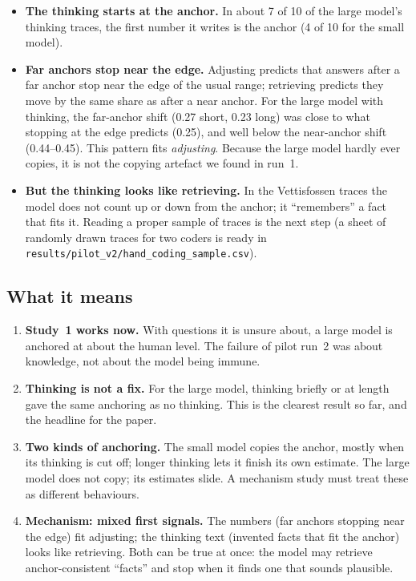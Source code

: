 \documentclass[11pt,a4paper]{article}
\begin{document}
\begin{itemize}[leftmargin=*]
  \item \textbf{The thinking starts at the anchor.} In about 7 of 10 of the large model's thinking traces, the first number it writes is the anchor (4 of 10 for the small model).
  \item \textbf{Far anchors stop near the edge.} Adjusting predicts that answers after a far anchor stop near the edge of the usual range; retrieving predicts they move by the same share as after a near anchor. For the large model with thinking, the far-anchor shift (0.27 short, 0.23 long) was close to what stopping at the edge predicts (0.25), and well below the near-anchor shift (0.44--0.45). This pattern fits \emph{adjusting}. Because the large model hardly ever copies, it is not the copying artefact we found in run~1.
  \item \textbf{But the thinking looks like retrieving.} In the Vettisfossen traces the model does not count up or down from the anchor; it \enquote{remembers} a fact that fits it. Reading a proper sample of traces is the next step (a sheet of randomly drawn traces for two coders is ready in \texttt{results/pilot\_v2/hand\_coding\_sample.csv}).
\end{itemize}

\subsection{What it means}

\begin{enumerate}[leftmargin=*]
  \item \textbf{Study~1 works now.} With questions it is unsure about, a large model is anchored at about the human level. The failure of pilot run~2 was about knowledge, not about the model being immune.
  \item \textbf{Thinking is not a fix.} For the large model, thinking briefly or at length gave the same anchoring as no thinking. This is the clearest result so far, and the headline for the paper.
  \item \textbf{Two kinds of anchoring.} The small model copies the anchor, mostly when its thinking is cut off; longer thinking lets it finish its own estimate. The large model does not copy; its estimates slide. A mechanism study must treat these as different behaviours.
  \item \textbf{Mechanism: mixed first signals.} The numbers (far anchors stopping near the edge) fit adjusting; the thinking text (invented facts that fit the anchor) looks like retrieving. Both can be true at once: the model may retrieve anchor-consistent \enquote{facts} and stop when it finds one that sounds plausible.
\end{enumerate}
\end{document}
